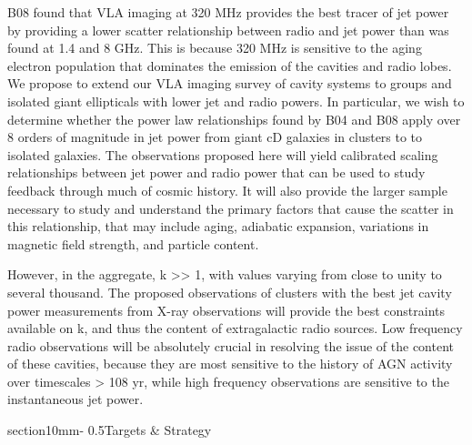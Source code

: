 \documentclass[letterpaper,11pt]{article}
\makeatletter
\renewcommand{\section}{\@startsection%
{section}{1}{0mm}{-\baselineskip}%
{0.5\baselineskip}{\normalfont\Large\bfseries}}%
\makeatother
\begin{document}
B08 found that VLA imaging at 320 MHz provides the best tracer of jet
power by providing a lower scatter relationship between radio and jet
power than was found at 1.4 and 8 GHz. This is because 320 MHz is
sensitive to the aging electron population that dominates the emission
of the cavities and radio lobes. We propose to extend our VLA imaging
survey of cavity systems to groups and isolated giant ellipticals with
lower jet and radio powers. In particular, we wish to determine
whether the power law relationships found by B04 and B08 apply over 8
orders of magnitude in jet power from giant cD galaxies in clusters to
to isolated galaxies. The observations proposed here will yield
calibrated scaling relationships between jet power and radio power
that can be used to study feedback through much of cosmic history. It
will also provide the larger sample necessary to study and understand
the primary factors that cause the scatter in this relationship, that
may include aging, adiabatic expansion, variations in magnetic field
strength, and particle content.

However, in the aggregate, k >> 1, with values varying from close to
unity to several thousand. The proposed observations of clusters with
the best jet cavity power measurements from X-ray observations will
provide the best constraints available on k, and thus the content of
extragalactic radio sources.  Low frequency radio observations will be
absolutely crucial in resolving the issue of the content of these
cavities, because they are most sensitive to the history of AGN
activity over timescales > 108 yr, while high frequency observations
are sensitive to the instantaneous jet power.

\section{Targets \& Strategy}
\end{document}
